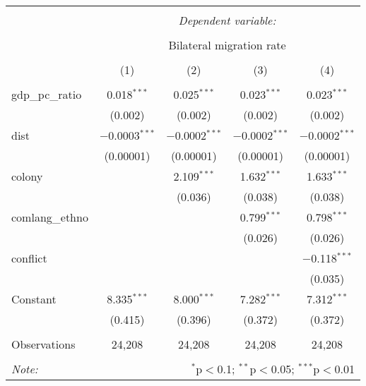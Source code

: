 
\begin{table}[!htbp] \centering 
  \caption{} 
  \label{} 
\begin{tabular}{@{\extracolsep{0pt}}lcccc} 
\\[-1.8ex]\hline 
\hline \\[-1.8ex] 
 & \multicolumn{4}{c}{\textit{Dependent variable:}} \\ 
\cline{2-5} 
\\[-1.8ex] & \multicolumn{4}{c}{Bilateral migration rate} \\ 
\\[-1.8ex] & (1) & (2) & (3) & (4)\\ 
\hline \\[-1.8ex] 
 gdp\_pc\_ratio & 0.018$^{***}$ & 0.025$^{***}$ & 0.023$^{***}$ & 0.023$^{***}$ \\ 
  & (0.002) & (0.002) & (0.002) & (0.002) \\ 
  dist & $-$0.0003$^{***}$ & $-$0.0002$^{***}$ & $-$0.0002$^{***}$ & $-$0.0002$^{***}$ \\ 
  & (0.00001) & (0.00001) & (0.00001) & (0.00001) \\ 
  colony &  & 2.109$^{***}$ & 1.632$^{***}$ & 1.633$^{***}$ \\ 
  &  & (0.036) & (0.038) & (0.038) \\ 
  comlang\_ethno &  &  & 0.799$^{***}$ & 0.798$^{***}$ \\ 
  &  &  & (0.026) & (0.026) \\ 
  conflict &  &  &  & $-$0.118$^{***}$ \\ 
  &  &  &  & (0.035) \\ 
  Constant & 8.335$^{***}$ & 8.000$^{***}$ & 7.282$^{***}$ & 7.312$^{***}$ \\ 
  & (0.415) & (0.396) & (0.372) & (0.372) \\ 
 \hline \\[-1.8ex] 
Observations & 24,208 & 24,208 & 24,208 & 24,208 \\ 
\hline 
\hline \\[-1.8ex] 
\textit{Note:}  & \multicolumn{4}{r}{$^{*}$p$<$0.1; $^{**}$p$<$0.05; $^{***}$p$<$0.01} \\ 
\end{tabular} 
\end{table} 
